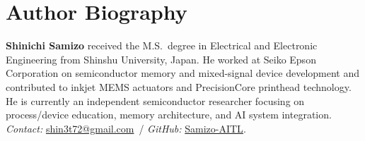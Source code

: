 \documentclass[conference]{IEEEtran}
\begin{document}
\section*{Author Biography}
\textbf{Shinichi Samizo} received the M.S.\ degree in Electrical and Electronic Engineering from Shinshu University, Japan. He worked at Seiko Epson Corporation on semiconductor memory and mixed-signal device development and contributed to inkjet MEMS actuators and PrecisionCore printhead technology. He is currently an independent semiconductor researcher focusing on process/device education, memory architecture, and AI system integration. \emph{Contact:} \href{mailto:shin3t72@gmail.com}{shin3t72@gmail.com}\, / \emph{GitHub:} \href{https://github.com/Samizo-AITL}{Samizo-AITL}.
\end{document}
